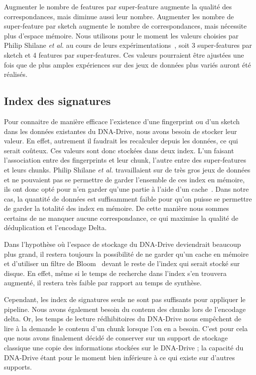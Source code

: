 \documentclass[a4paper]{report}
\makeatletter
\newcommand{\etal}{\emph{et al.}\@\xspace}
\makeatother
\begin{document}
Augmenter le nombre de features par super-feature augmente la qualité des correspondances,
mais diminue aussi leur nombre.
Augmenter les nombre de super-feature par sketch augmente le nombre de correspondances,
mais nécessite plus d'espace mémoire.
Nous utilisons pour le moment les valeurs choisies par Philip Shilane \etal
au cours de leurs expérimentations~\cite{shilane2012wan},
soit 3 super-features par sketch et 4 features par super-features.
Ces valeurs pourraient être ajustées une fois que de plus amples expériences
sur des jeux de données plus variés auront été réalisés.

\subsection{Index des signatures}
Pour connaitre de manière efficace l'existence d'une fingerprint
ou d'un sketch dans les données existantes du DNA-Drive, nous avons besoin de stocker leur valeur.
En effet, autrement il faudrait les recalculer depuis les données, ce qui serait coûteux.
Ces valeurs sont donc stockées dans deux index.
L'un faisant l'association entre des fingerprints et leur chunk,
l'autre entre des super-features et leurs chunks.
Philip Shilane \etal travaillaient sur de très gros jeux de données
et ne pouvaient pas se permettre de garder l'ensemble de ces index en mémoire,
ils ont donc opté pour n'en garder qu'une partie à l'aide d'un cache~\cite{shilane2012wan}.
Dans notre cas, la quantité de données est suffisamment faible pour qu'on puisse se permettre
de garder la totalité des index en mémoire.
De cette manière nous sommes certains de ne manquer aucune correspondance,
ce qui maximise la qualité de déduplication et l'encodage Delta.

Dans l'hypothèse où l'espace de stockage du DNA-Drive deviendrait beaucoup plus grand,
il restera toujours la possibilité de ne garder qu'un cache en mémoire
et d'utiliser un filtre de Bloom~\cite{bloom1970space} devant le reste de l'index
qui serait stocké sur disque.
En effet, même si le temps de recherche dans l'index s'en trouvera augmenté,
il restera très faible par rapport au temps de synthèse.

Cependant, les index de signatures seuls ne sont pas suffisants pour appliquer le pipeline.
Nous avons également besoin du contenu des chunks lors de l'encodage delta.
Or, les temps de lecture rédhibitoires du DNA-Drive nous empêchent de lire à la demande
le contenu d'un chunk lorsque l'on en a besoin.
C'est pour cela que nous avons finalement décidé de conserver sur un support de stockage classique
une copie des informations stockées sur le DNA-Drive ;
la capacité du DNA-Drive étant pour le moment bien inférieure à ce qui existe sur d'autres supports.
\end{document}
